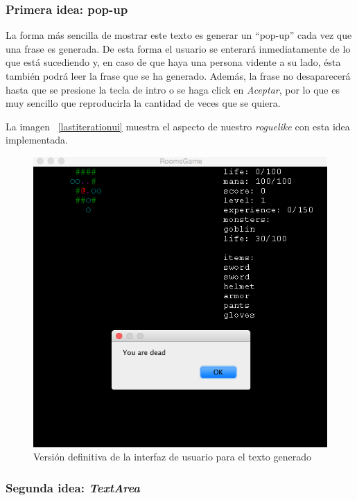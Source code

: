 \subsubsection{Primera idea: pop-up}

La forma más sencilla de mostrar este texto es generar un ``pop-up'' cada vez que una frase es generada. De esta forma el usuario se enterará inmediatamente de lo que está sucediendo y, en caso de que haya una persona vidente a su lado, ésta también podrá leer la frase que se ha generado. Además, la frase no desaparecerá hasta que se presione la tecla de intro o se haga click en \textit{Aceptar}, por lo que es muy sencillo que reproducirla la cantidad de veces que se quiera.

La imagen ~\ref{lastiterationui} muestra el aspecto de nuestro \textit{roguelike} con esta idea implementada.

\begin{figure}
    \includegraphics[width=\textwidth,height=\textheight,keepaspectratio]{./img/firstiterationui.png}
  \caption{Versión definitiva de la interfaz de usuario para el texto generado}
  \label{fig:firstiterationui}
\end{figure}

\subsubsection{Segunda idea: \textit{TextArea}}

